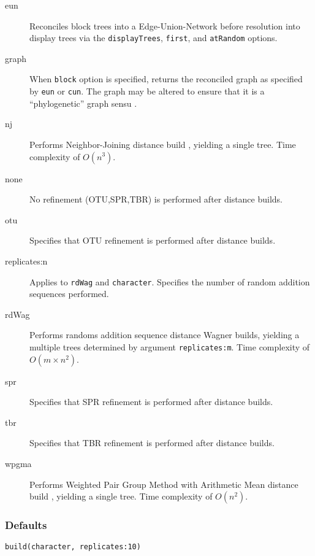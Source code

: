 \begin{description}
		\item [eun] Reconciles block trees into a Edge-Union-Network \citep{MiyagiandWheeler2019, 
		Wheeler2022} before resolution into display trees via the \texttt{displayTrees}, \texttt{first}, and 
		\texttt{atRandom} options.

		\item [graph] When \texttt{block} option is specified, returns the reconciled graph as specified by 
		\texttt{eun} or \texttt{cun}. The graph may be altered to ensure that it is a ``phylogenetic'' graph 
		sensu \cite{Moretetal2005}.
		
		\item [nj] Performs Neighbor-Joining distance build \citep{Saitou1987}, yielding a single tree. 
		Time complexity of $O(n^3)$.

		\item [none] No refinement (OTU,SPR,TBR) is performed after distance builds.
	
		\item [otu] Specifies that OTU refinement \citep{Wheeler2021} is performed after distance builds.	
		
		\item [replicates:n] Applies to \texttt{rdWag} and \texttt{character}. Specifies the number of 
		random addition sequences performed. 
		
		\item [rdWag] Performs randoms addition sequence distance Wagner builds, yielding a multiple 
		trees determined by argument \texttt{replicates:m}. Time complexity of $O(m \times n^2)$.

		\item [spr] Specifies that SPR refinement \citep{Dayhoff1969} is performed after distance builds.

		\item [tbr] Specifies that TBR refinement \citep{Farris1988, swofford1990a} is performed after 
		distance builds.
		
		\item [wpgma] Performs Weighted Pair Group Method with Arithmetic Mean distance build 
		\citep{SokalandMichener1958}, yielding a single tree. Time complexity of $O(n^2)$.
	
	\end{description}		

	\subsubsection{Defaults}
		\texttt{build(character, replicates:10)}


